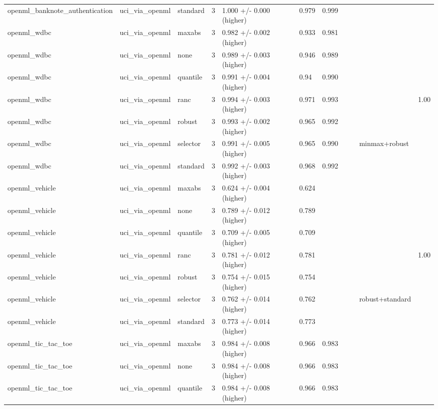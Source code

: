 \begin{tabular}{lllllllllll}
openml\_banknote\_authentication & uci\_via\_openml & standard & 3 & 1.000 +/- 0.000 (higher) & 0.979 & 0.999 &  &  &  &  \\
openml\_wdbc & uci\_via\_openml & maxabs & 3 & 0.982 +/- 0.002 (higher) & 0.933 & 0.981 &  &  &  &  \\
openml\_wdbc & uci\_via\_openml & none & 3 & 0.989 +/- 0.003 (higher) & 0.946 & 0.989 &  &  &  &  \\
openml\_wdbc & uci\_via\_openml & quantile & 3 & 0.991 +/- 0.004 (higher) & 0.94 & 0.990 &  &  &  &  \\
openml\_wdbc & uci\_via\_openml & ranc & 3 & 0.994 +/- 0.003 (higher) & 0.971 & 0.993 &  &  &  & 1.00 \\
openml\_wdbc & uci\_via\_openml & robust & 3 & 0.993 +/- 0.002 (higher) & 0.965 & 0.992 &  &  &  &  \\
openml\_wdbc & uci\_via\_openml & selector & 3 & 0.991 +/- 0.005 (higher) & 0.965 & 0.990 &  &  & minmax+robust &  \\
openml\_wdbc & uci\_via\_openml & standard & 3 & 0.992 +/- 0.003 (higher) & 0.968 & 0.992 &  &  &  &  \\
openml\_vehicle & uci\_via\_openml & maxabs & 3 & 0.624 +/- 0.004 (higher) & 0.624 &  &  &  &  &  \\
openml\_vehicle & uci\_via\_openml & none & 3 & 0.789 +/- 0.012 (higher) & 0.789 &  &  &  &  &  \\
openml\_vehicle & uci\_via\_openml & quantile & 3 & 0.709 +/- 0.005 (higher) & 0.709 &  &  &  &  &  \\
openml\_vehicle & uci\_via\_openml & ranc & 3 & 0.781 +/- 0.012 (higher) & 0.781 &  &  &  &  & 1.00 \\
openml\_vehicle & uci\_via\_openml & robust & 3 & 0.754 +/- 0.015 (higher) & 0.754 &  &  &  &  &  \\
openml\_vehicle & uci\_via\_openml & selector & 3 & 0.762 +/- 0.014 (higher) & 0.762 &  &  &  & robust+standard &  \\
openml\_vehicle & uci\_via\_openml & standard & 3 & 0.773 +/- 0.014 (higher) & 0.773 &  &  &  &  &  \\
openml\_tic\_tac\_toe & uci\_via\_openml & maxabs & 3 & 0.984 +/- 0.008 (higher) & 0.966 & 0.983 &  &  &  &  \\
openml\_tic\_tac\_toe & uci\_via\_openml & none & 3 & 0.984 +/- 0.008 (higher) & 0.966 & 0.983 &  &  &  &  \\
openml\_tic\_tac\_toe & uci\_via\_openml & quantile & 3 & 0.984 +/- 0.008 (higher) & 0.966 & 0.983 &  &  &  &  \\

\end{tabular}
